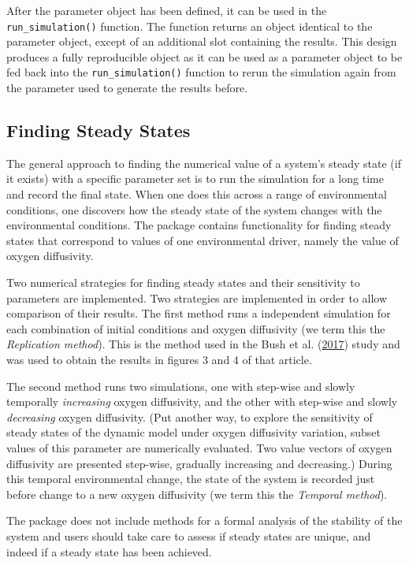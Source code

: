 \documentclass[
]{article}
\begin{document}
After the parameter object has been defined, it can be used in the
\texttt{run\_simulation()} function. The function returns an object
identical to the parameter object, except of an additional slot
containing the results. This design produces a fully reproducible object
as it can be used as a parameter object to be fed back into the
\texttt{run\_simulation()} function to rerun the simulation again from
the parameter used to generate the results before.

\hypertarget{finding-steady-states}{%
\subsection{Finding Steady States}\label{finding-steady-states}}

The general approach to finding the numerical value of a system's steady
state (if it exists) with a specific parameter set is to run the
simulation for a long time and record the final state. When one does
this across a range of environmental conditions, one discovers how the
steady state of the system changes with the environmental conditions.
The package contains functionality for finding steady states that
correspond to values of one environmental driver, namely the value of
oxygen diffusivity.

Two numerical strategies for finding steady states and their sensitivity
to parameters are implemented. Two strategies are implemented in order
to allow comparison of their results. The first method runs a
independent simulation for each combination of initial conditions and
oxygen diffusivity (we term this the \emph{Replication method}). This is
the method used in the Bush et al.
(\protect\hyperlink{ref-Bush2017}{2017}) study and was used to obtain
the results in figures 3 and 4 of that article.

The second method runs two simulations, one with step-wise and slowly
temporally \emph{increasing} oxygen diffusivity, and the other with
step-wise and slowly \emph{decreasing} oxygen diffusivity. (Put another
way, to explore the sensitivity of steady states of the dynamic model
under oxygen diffusivity variation, subset values of this parameter are
numerically evaluated. Two value vectors of oxygen diffusivity are
presented step-wise, gradually increasing and decreasing.) During this
temporal environmental change, the state of the system is recorded just
before change to a new oxygen diffusivity (we term this the
\emph{Temporal method}).

The package does not include methods for a formal analysis of the
stability of the system and users should take care to assess if steady
states are unique, and indeed if a steady state has been achieved.
\end{document}
